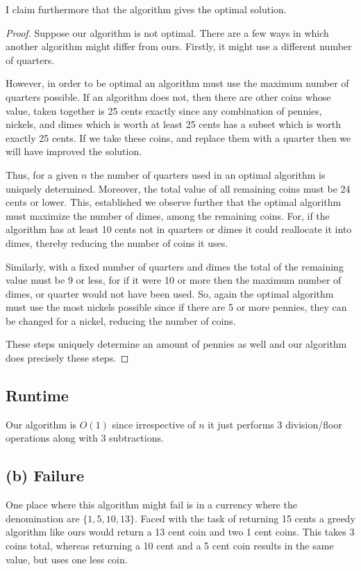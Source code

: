 \documentclass{article}
\begin{document}
I claim furthermore that the algorithm gives the optimal solution.

\begin{proof}Suppose our algorithm is not optimal. There are a few ways in which another algorithm might differ from ours. Firstly, it might use a different number of quarters. 

However, in order to be optimal an algorithm must use the maximum number of quarters possible. If an algorithm does not, then there are other coins whose value, taken together is 25 cents exactly since any combination of pennies, nickels, and dimes which is worth at least 25 cents has a subset which is worth exactly 25 cents. If we take these coins, and replace them with a quarter then we will have improved the solution. 

Thus, for a given $n$ the number of quarters used in an optimal algorithm is uniquely determined. Moreover, the total value of all remaining coins must be 24 cents or lower. This, established we observe further that the optimal algorithm must maximize the number of dimes, among the remaining coins. For, if the algorithm has at least 10 cents not in quarters or dimes it could reallocate it into dimes, thereby reducing the number of coins it uses.

Similarly, with a fixed number of quarters and dimes the total of the remaining value must be 9 or less, for if it were 10 or more then the maximum number of dimes, or quarter would not have been used. So, again the optimal algorithm must use the most nickels possible since if there are 5 or more pennies, they can be changed for a nickel, reducing the number of coins.

These steps uniquely determine an amount of pennies as well and our algorithm does precisely these steps.\end{proof}

\subsection{Runtime}
Our algorithm is $O(1)$ since irrespective of $n$ it just performs 3 division/floor operations along with 3 subtractions.

\subsection{(b) Failure}

One place where this algorithm might fail is in a currency where the  denomination are $\{1,5,10,13\}$. Faced with the task of returning 15 cents a greedy algorithm like ours would return a 13 cent coin and two 1 cent coins. This takes 3 coins total, whereas returning a 10 cent and a 5 cent coin results in the same value, but uses one less coin.
\end{document}
